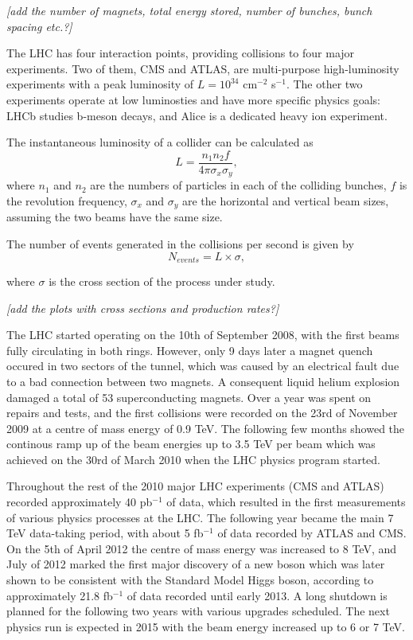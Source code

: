 \textit{[add the number of magnets, total energy stored, number of bunches, bunch spacing etc.?]}

The LHC has four interaction points, providing collisions to four major experiments. Two of them, CMS and ATLAS, are
multi-purpose high-luminosity experiments with a peak luminosity of $L = 10^{34}$ cm$^{-2}$ s$^{-1}$. The other two
experiments operate at low luminosties and have more specific physics goals: LHCb studies b-meson decays, and Alice is a
dedicated heavy ion experiment.

The instantaneous luminosity of a collider can be calculated as
\begin{equation}
	L = \frac{n_1 n_2 f}{4 \pi \sigma_x \sigma_y},
\end{equation}
where $n_1$ and $n_2$ are the numbers of particles in each of the colliding bunches, $f$ is the revolution frequency,
$\sigma_x$ and $\sigma_y$ are the horizontal and vertical beam sizes, assuming the two beams have the same
size.

The number of events generated in the collisions per second is given by
\begin{equation}
	N_{events} = L \times \sigma,
\end{equation}

where $\sigma$ is the cross section of the process under study.

\textit{[add the plots with cross sections and production rates?]}

The LHC started operating on the 10th of September 2008, with the first beams fully circulating in both rings. However,
only 9 days later a magnet quench occured in two sectors of the tunnel, which was caused by an electrical fault due to a
bad connection between two magnets. A consequent liquid helium explosion damaged a total of 53 superconducting magnets.
Over a year was spent on repairs and tests, and the first collisions were recorded on the 23rd of November 2009 at a
centre of mass energy of 0.9 TeV. The following few months showed the continous ramp up of the beam energies up to 3.5
TeV per beam which was achieved on the 30rd of March 2010 when the LHC physics program started.

Throughout the rest of the 2010 major LHC experiments (CMS and ATLAS) recorded approximately 40 pb$^{-1}$ of data,
which resulted in the first measurements of various physics processes at the LHC. The following year became the main 7
TeV data-taking period, with about 5 fb$^{-1}$ of data recorded by ATLAS and CMS. On the 5th of April 2012 the centre
of mass energy was increased to 8 TeV, and July of 2012 marked the first major discovery of a new boson which
was later shown to be consistent with the Standard Model Higgs boson, according to approximately 21.8
fb$^{-1}$ of data recorded until early 2013. A long shutdown is planned for the following two years with various
upgrades scheduled. The next physics run is expected in 2015 with the beam energy increased up to 6 or 7 TeV. 

